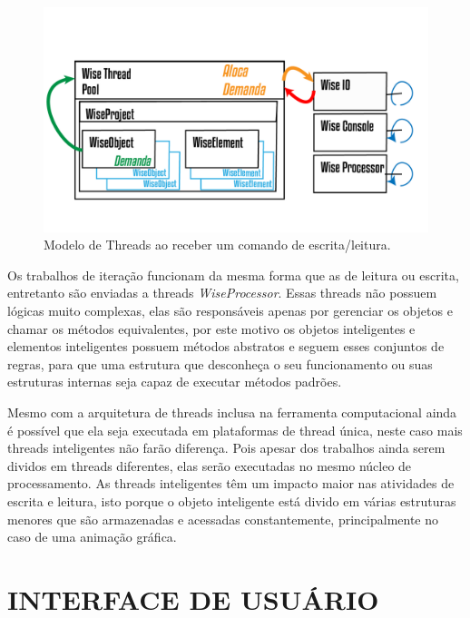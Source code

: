 \documentclass[a4paper,12pt]{monografia}
\theoremstyle{plain}
\theoremstyle{definition}
\theoremstyle{remark}
\begin{document}
\begin{figure}[!htbp]
	\centering
	\includegraphics[scale=1]{Figures/WiseThreadPoolHeating.png}
	\caption{Modelo de Threads ao receber um comando de escrita/leitura.}
	\label{fig9:threads}
\end{figure}

Os trabalhos de iteração funcionam da mesma forma que as de leitura ou escrita, entretanto são enviadas a threads \textit{WiseProcessor}. Essas threads não possuem lógicas muito complexas, elas são responsáveis apenas por gerenciar os objetos e chamar os métodos equivalentes, por este motivo os objetos inteligentes e elementos inteligentes possuem métodos abstratos e seguem esses conjuntos de regras, para que uma estrutura que desconheça o seu funcionamento ou suas estruturas internas seja capaz de executar métodos padrões. 

Mesmo com a arquitetura de threads inclusa na ferramenta computacional ainda é possível que ela seja executada em plataformas de thread única, neste caso mais threads inteligentes não farão diferença. Pois apesar dos trabalhos ainda serem dividos em threads diferentes, elas serão executadas no mesmo núcleo de processamento. As threads inteligentes têm um impacto maior nas atividades de escrita e leitura, isto porque o objeto inteligente está divido em várias estruturas menores que são armazenadas e acessadas constantemente, principalmente no caso de uma animação gráfica.

\section{INTERFACE DE USUÁRIO}\label{sec:userinterface}
\end{document}
